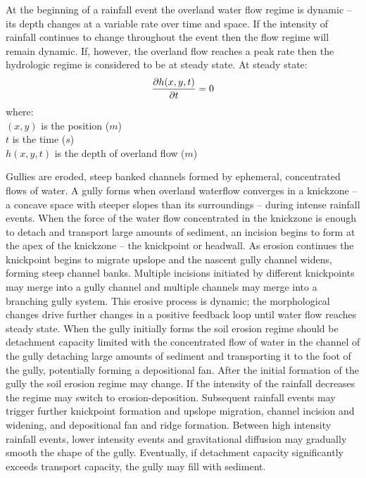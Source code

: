 \documentclass[esurf, manuscript]{copernicus}
\begin{document}
At the beginning of a rainfall event 
the overland water flow regime is dynamic -- 
its depth changes at a variable rate over time and space. 
If the intensity of rainfall continues to change throughout the event
then the flow regime will remain dynamic. 
If, however, the overland flow reaches a peak rate
then the hydrologic regime is considered to be at steady state.
At steady state:
\begin{equation}
\label{eq:steady_state}
{\partial h(x,y,t) \over \partial t} = 0 %
\end{equation}
%
{\small
\noindent
where: \\
\noindent
\hspace*{0.5em} $(x,y)$ is the position ($m$)\\
\hspace*{0.5em} $t$ is the time ($s$) \\
\hspace*{0.5em} $h(x,y,t)$ is the depth of overland flow ($m$)\\
}

Gullies are eroded, steep banked channels 
formed by ephemeral, concentrated flows of water.
A gully forms when overland waterflow
converges in a knickzone
-- a concave space with steeper slopes than its surroundings -- 
during intense rainfall events.  
When the force of the water flow concentrated in the knickzone
is enough to detach and transport large amounts of sediment,
an incision begins to form at the apex of the knickzone 
-- the knickpoint or headwall.
As erosion continues the knickpoint begins to migrate upslope
and the nascent gully channel widens,
forming steep channel banks. 
Multiple incisions initiated by different knickpoints 
may merge into a gully channel
and multiple channels may merge into a branching gully system. 
This erosive process is dynamic; 
the morphological changes drive further changes 
in a positive feedback loop
until water flow reaches steady state. 
When the gully initially forms 
the soil erosion regime should be detachment capacity limited
with the concentrated flow of water in the channel of the gully 
detaching large amounts of sediment and transporting it to the foot of the gully, 
potentially forming a depositional fan. 
After the initial formation of the gully
the soil erosion regime may change.
If the intensity of the rainfall decreases
the regime may switch to erosion-deposition. 
Subsequent rainfall events may trigger further 
knickpoint formation and upslope migration, channel incision and widening, and
depositional fan and ridge formation. 
Between high intensity rainfall events, 
lower intensity events and gravitational diffusion
may gradually smooth the shape of the gully. 
Eventually, if detachment capacity significantly exceeds transport capacity, 
the gully may fill with sediment. 
\end{document}

